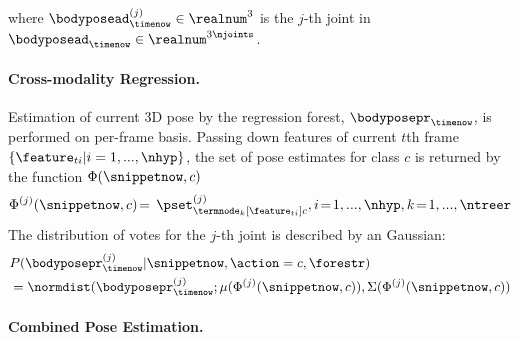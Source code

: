 where $\bodyposead_{\timenow}^{(j)}\in\realnum^{3}$ is the $j$-th joint in $\bodyposead_{\timenow}\in\realnum^{3\njoints}$.
\paragraph{Cross-modality Regression.}
\label{sec:jrftest}
Estimation of current 3D pose by the regression forest, $\bodyposepr_{\timenow}$, is performed on per-frame basis. 
Passing down features of current $t$th frame $\{\feature_{ti}|i = 1,...,\nhyp\}$, the set of pose estimates for class $c$ is returned by the function $\Phi(\snippetnow, c)$
\begin{equation}
	\label{eq:regressset}
	\Phi^{(j)}(\snippetnow, c)\!=\!\ \pset^{(j)}_{\termnode_{k}[\feature_{ti}]c},  i\!=\!1,...,\nhyp,k\!=\!1,...,\ntreer
\end{equation} 
The distribution of votes for the $j$-th joint is described by an Gaussian: 
\begin{equation}
	\begin{split}
		& P( \bodyposepr_{\timenow}^{(j)}| \snippetnow, \action = c, \forestr)\\ 
		& = \normdist(\bodyposepr_{\timenow}^{(j)};\mu(\Phi^{(j)}(\snippetnow, c)),\Sigma(\Phi^{(j)}(\snippetnow,c))
\end{split}
\end{equation}




\paragraph{Combined Pose Estimation.}

